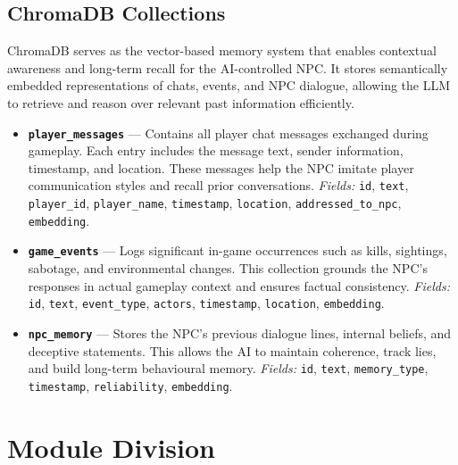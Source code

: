 \subsection*{ChromaDB Collections}

ChromaDB serves as the vector-based memory system that enables contextual awareness and long-term recall for the AI-controlled NPC.
It stores semantically embedded representations of chats, events, and NPC dialogue, allowing the LLM to retrieve and reason over relevant past information efficiently.

\begin{itemize}

    \item \textbf{\texttt{player\_messages}} --- Contains all player chat messages exchanged during gameplay.
    Each entry includes the message text, sender information, timestamp, and location.
    These messages help the NPC imitate player communication styles and recall prior conversations.
    \textit{Fields:} \texttt{id}, \texttt{text}, \texttt{player\_id}, \texttt{player\_name}, \texttt{timestamp}, \texttt{location}, \texttt{addressed\_to\_npc}, \texttt{embedding}.

    \item \textbf{\texttt{game\_events}} --- Logs significant in-game occurrences such as kills, sightings, sabotage, and environmental changes.
    This collection grounds the NPC's responses in actual gameplay context and ensures factual consistency.
    \textit{Fields:} \texttt{id}, \texttt{text}, \texttt{event\_type}, \texttt{actors}, \texttt{timestamp}, \texttt{location}, \texttt{embedding}.

    \item \textbf{\texttt{npc\_memory}} --- Stores the NPC's previous dialogue lines, internal beliefs, and deceptive statements.
    This allows the AI to maintain coherence, track lies, and build long-term behavioural memory.
    \textit{Fields:} \texttt{id}, \texttt{text}, \texttt{memory\_type}, \texttt{timestamp}, \texttt{reliability}, \texttt{embedding}.

\end{itemize}

\section{Module Division}

